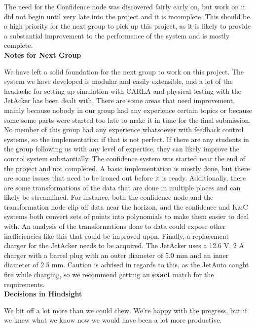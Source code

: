 \documentclass[titlepage, draft]{article}
\begin{document}
{The need for the Confidence node was discovered fairly early on, but work on it did not begin until very late into the project and it is incomplete. This should be a high priority for the next group to pick up this project, as it is likely to provide a substantial improvement to the performance of the system and is mostly complete.\\


\textbf{Notes for Next Group}

We have left a solid foundation for the next group to work on this project. The system we have developed is modular and easily extensible, and a lot of the headache for setting up simulation with CARLA and physical testing with the JetAcker has been dealt with. There are some areas that need improvement, mainly because nobody in our group had any experience certain topics or because some some parts were started too late to make it in time for the final submission. No member of this group had any experience whatsoever with feedback control systems, so the implementation if that is not perfect. If there are any students in the group following us with any level of expertise, they can likely improve the control system substantially. The confidence system was started near the end of the project and not completed. A basic implementation is mostly done, but there are some issues that need to be ironed out before it is ready. Additionally, there are some transformations of the data that are done in multiple places and can likely be streamlined. For instance, both the confidence node and the transformation node clip off data near the horizon, and the confidence and K\&C systems both convert sets of points into polynomials to make them easier to deal with. An analysis of the transformations done to data could expose other inefficiencies like this that could be improved upon. Finally, a replacement charger for the JetAcker needs to be acquired. The JetAcker uses a 12.6 V, 2 A charger with a barrel plug with an outer diameter of 5.0 mm and an inner diameter of 2.5 mm. Caution is advised in regards to this, as the JetAuto caught fire while charging, so we recommend getting an \textbf{exact} match for the requirements.\\


\textbf{Decisions in Hindsight}

We bit off a lot more than we could chew. We're happy with the progress, but if we knew what we know now we would have been a lot more productive.

\vspace{12pt}

}
\end{document}
